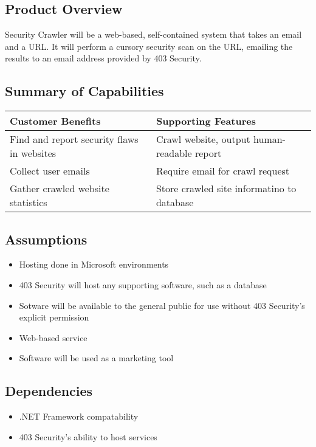 \subsection{Product Overview}

Security Crawler will be a web-based, self-contained system that takes an email and a URL.  It will perform a cursory security scan on the URL, emailing the results to an email address provided by 403 Security.

\subsection{Summary of Capabilities}
\begin{tabularx}{\textwidth}{|X|X|}
    \hline
    {\bf Customer Benefits} & {\bf Supporting Features} \\ \hline
    Find and report security flaws in websites & Crawl website, output human-readable report \\ \hline
    Collect user emails & Require email for crawl request \\ \hline
    Gather crawled website statistics & Store crawled site informatino to database \\ \hline 
\end{tabularx}

\subsection{Assumptions}
\begin{itemize}
    \item Hosting done in Microsoft environments
    \item 403 Security will host any supporting software, such as a database
    \item Sotware will be available to the general public for use without 403 Security's explicit permission
    \item Web-based service
    \item Software will be used as a marketing tool
\end{itemize}

\subsection{Dependencies}
\begin{itemize}
    \item .NET Framework compatability
    \item 403 Security's ability to host services
\end{itemize}

